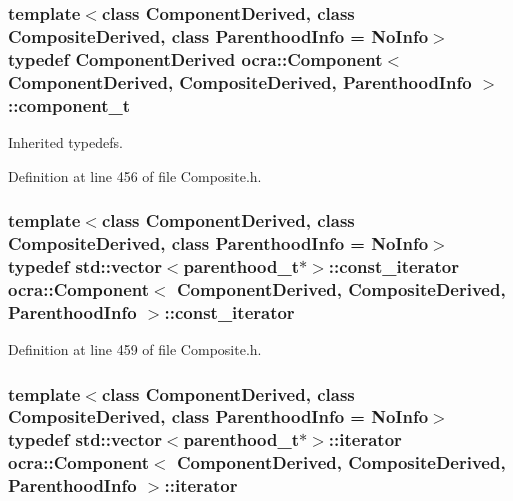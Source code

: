 \subsubsection[{\texorpdfstring{component\+\_\+t}{component_t}}]{\setlength{\rightskip}{0pt plus 5cm}template$<$class Component\+Derived, class Composite\+Derived, class Parenthood\+Info = No\+Info$>$ typedef Component\+Derived {\bf ocra\+::\+Component}$<$ Component\+Derived, Composite\+Derived, Parenthood\+Info $>$\+::{\bf component\+\_\+t}}\hypertarget{classocra_1_1Component_aecb250aaac3aad8d82ba30303b10cf2a}{}\label{classocra_1_1Component_aecb250aaac3aad8d82ba30303b10cf2a}


Inherited typedefs. 



Definition at line 456 of file Composite.\+h.

\subsubsection[{\texorpdfstring{const\+\_\+iterator}{const_iterator}}]{\setlength{\rightskip}{0pt plus 5cm}template$<$class Component\+Derived, class Composite\+Derived, class Parenthood\+Info = No\+Info$>$ typedef std\+::vector$<${\bf parenthood\+\_\+t}$\ast$$>$\+::{\bf const\+\_\+iterator} {\bf ocra\+::\+Component}$<$ Component\+Derived, Composite\+Derived, Parenthood\+Info $>$\+::{\bf const\+\_\+iterator}}\hypertarget{classocra_1_1Component_a6271631f04d2911e4369d1288074eebb}{}\label{classocra_1_1Component_a6271631f04d2911e4369d1288074eebb}


Definition at line 459 of file Composite.\+h.

\subsubsection[{\texorpdfstring{iterator}{iterator}}]{\setlength{\rightskip}{0pt plus 5cm}template$<$class Component\+Derived, class Composite\+Derived, class Parenthood\+Info = No\+Info$>$ typedef std\+::vector$<${\bf parenthood\+\_\+t}$\ast$$>$\+::{\bf iterator} {\bf ocra\+::\+Component}$<$ Component\+Derived, Composite\+Derived, Parenthood\+Info $>$\+::{\bf iterator}}\hypertarget{classocra_1_1Component_a9b76b63c3248ec96dfdaca00d712c1c9}{}\label{classocra_1_1Component_a9b76b63c3248ec96dfdaca00d712c1c9}


